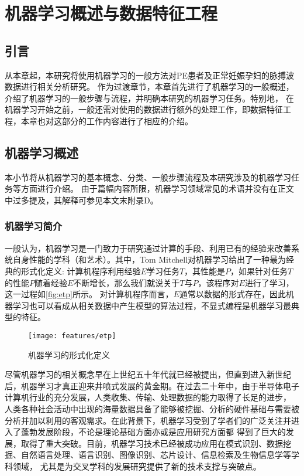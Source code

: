 \chapter{机器学习概述与数据特征工程}
\section{引言}
从本章起，本研究将使用机器学习的一般方法对PE患者及正常妊娠孕妇的脉搏波数据进行相关分析研究。
作为过渡章节，本章首先进行了机器学习的一般概述，介绍了机器学习的一般步骤与流程，并明确本研究的机器学习任务。特别地，
在机器学习开始之前，一般还需对使用的数据进行额外的处理工作，即数据特征工程，本章也对这部分的工作内容进行了相应的介绍。

\section{机器学习概述}
本小节将从机器学习的基本概念、分类、一般步骤流程及本研究涉及的机器学习任务等方面进行介绍。
由于篇幅内容所限，机器学习领域常见的术语并没有在正文中过多提及，其解释可参见本文末附录D。
\subsection{机器学习简介}
一般认为，机器学习是一门致力于研究通过计算的手段、利用已有的经验来改善系统自身性能的学科（和艺术）\cite{Zhou2016,Aurélien2018}。其中，Tom Mitchell对机器学习给出了一种最为经典的形式化定义:
计算机程序利用经验$E$学习任务$T$，其性能是$P$，如果针对任务$T$的性能$P$随着经验$E$不断增长，那么我们就说关于$T$与$P$，该程序对$E$进行了学习，这一过程如\autoref{fig:etp}所示\cite{mitchell1997,Zhou2016}。
对计算机程序而言，$E$通常以数据的形式存在，因此机器学习也可以看成从相关数据中产生模型的算法过程，不显式编程是机器学习最典型的特征。
\begin{figure}[htbp]
  \centering
  \texttt{[image: features/etp]}
  \caption[机器学习方法的形式化定义]{\label{fig:etp}机器学习的形式化定义}
\end{figure}

尽管机器学习的相关概念早在上世纪五十年代就已经被提出，但直到进入新世纪后，机器学习才真正迎来井喷式发展的黄金期。在过去二十年中，由于半导体电子计算机行业的充分发展，人类收集、传输、处理数据的能力取得了长足的进步，
人类各种社会活动中出现的海量数据具备了能够被挖掘、分析的硬件基础与需要被分析并加以利用的客观需求。在此背景下，机器学习受到了学者们的广泛关注并进入了蓬勃发展阶段，不论是理论基础方面亦或是应用研究方面都
得到了巨大的发展，取得了重大突破。目前，机器学习技术已经被成功应用在模式识别、数据挖掘、自然语言处理、语言识别、图像识别、芯片设计、信息检索及生物信息学等学科领域，
尤其是为交叉学科的发展研究提供了新的技术支撑与突破点\cite{Zhou2016,Aurélien2018,Li2017}。

